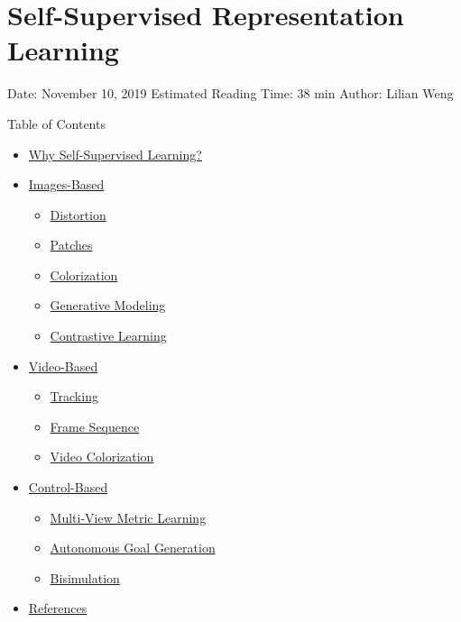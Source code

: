 \section{Self-Supervised Representation Learning}\label{self-supervised-representation-learning}

Date: November 10, 2019 \textbar{} Estimated Reading Time: 38 min \textbar{} Author: Lilian Weng

{Table of Contents}

\begin{itemize}
\tightlist
\item
  \hyperref[why-self-supervised-learning]{Why Self-Supervised Learning?}
\item
  \hyperref[images-based]{Images-Based}

  \begin{itemize}
  \tightlist
  \item
    \hyperref[distortion]{Distortion}
  \item
    \hyperref[patches]{Patches}
  \item
    \hyperref[colorization]{Colorization}
  \item
    \hyperref[generative-modeling]{Generative Modeling}
  \item
    \hyperref[contrastive-learning]{Contrastive Learning}
  \end{itemize}
\item
  \hyperref[video-based]{Video-Based}

  \begin{itemize}
  \tightlist
  \item
    \hyperref[tracking]{Tracking}
  \item
    \hyperref[frame-sequence]{Frame Sequence}
  \item
    \hyperref[video-colorization]{Video Colorization}
  \end{itemize}
\item
  \hyperref[control-based]{Control-Based}

  \begin{itemize}
  \tightlist
  \item
    \hyperref[multi-view-metric-learning]{Multi-View Metric Learning}
  \item
    \hyperref[autonomous-goal-generation]{Autonomous Goal Generation}
  \item
    \hyperref[bisimulation]{Bisimulation}
  \end{itemize}
\item
  \hyperref[references]{References}
\end{itemize}

